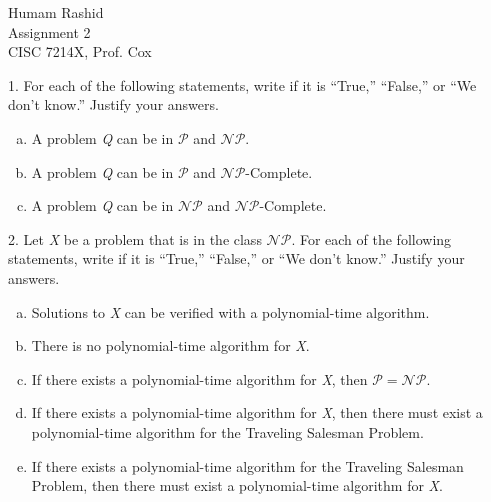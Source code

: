 \documentclass{scrartcl}
\begin{document}
\begin{flushleft}

    Humam Rashid\\
    Assignment 2\\
    CISC 7214X, Prof. Cox\\
    \bigskip

    1. For each of the following statements, write if it is ``True,'' ``False,'' or ``We don't
    know.'' Justify your answers.\\
    \begin{enumerate}[(a)]
        \item A problem \emph{Q} can be in $\mathcal{P}$ and $\mathcal{NP}$.
        \item A problem \emph{Q} can be in $\mathcal{P}$ and $\mathcal{NP}$-Complete.
        \item A problem \emph{Q} can be in $\mathcal{NP}$ and $\mathcal{NP}$-Complete.
    \end{enumerate}
    2. Let \emph{X} be a problem that is in the class $\mathcal{NP}$. For each of the following
    statements, write if it is ``True,'' ``False,'' or ``We don't know.'' Justify your answers.\\
    \begin{enumerate}[(a)]
        \item Solutions to \emph{X} can be verified with a polynomial-time algorithm.
        \item There is no polynomial-time algorithm for \emph{X}.
        \item If there exists a polynomial-time algorithm for \emph{X}, then $\mathcal{P} =
            \mathcal{NP}$.
        \item If there exists a polynomial-time algorithm for \emph{X}, then there must exist a
            polynomial-time algorithm for the Traveling Salesman Problem.
        \item If there exists a polynomial-time algorithm for the Traveling Salesman Problem, then
            there must exist a polynomial-time algorithm for \emph{X}.
    \end{enumerate}
    
\end{flushleft}
\end{document}
